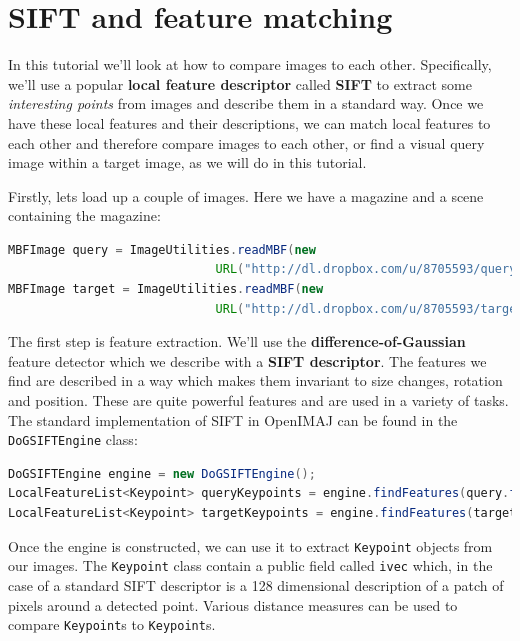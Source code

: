 \documentclass[10pt,a4paper,twoside,extrafontsizes]{memoir}
\begin{document}
\chapter{SIFT and feature matching}
In this tutorial we'll look at how to compare images to each other. Specifically, we'll use a
popular \textbf{local feature descriptor} called \textbf{SIFT} to extract some \emph{interesting points} 
from images and describe them in a standard way. Once we have these local features and their 
descriptions, we can match local features to each other and therefore compare images to each 
other, or find a visual query image within a target image, as we will do in this tutorial.

Firstly, lets load up a couple of images. Here we have a magazine and a scene containing the 
magazine:
\begin{lstlisting}[language=java]
MBFImage query = ImageUtilities.readMBF(new 
                             URL("http://dl.dropbox.com/u/8705593/query.jpg"));
MBFImage target = ImageUtilities.readMBF(new 
                             URL("http://dl.dropbox.com/u/8705593/target.jpg"));
\end{lstlisting}
The first step is feature extraction. We'll use the \textbf{difference-of-Gaussian} feature detector 
which we describe with a \textbf{SIFT descriptor}. The features we find are described in a way which 
makes them invariant to size changes, rotation and position. These are quite powerful features and 
are used in a variety of tasks. The standard implementation of SIFT in OpenIMAJ can be found in the 
\verb+DoGSIFTEngine+ class:
\begin{lstlisting}[language=java]
DoGSIFTEngine engine = new DoGSIFTEngine();	
LocalFeatureList<Keypoint> queryKeypoints = engine.findFeatures(query.flatten());
LocalFeatureList<Keypoint> targetKeypoints = engine.findFeatures(target.flatten());
\end{lstlisting}
Once the engine is constructed, we can use it to extract \verb+Keypoint+ objects from our images. 
The \verb+Keypoint+ class contain a public field called \verb+ivec+ which, in the case
of a standard SIFT descriptor is a 128 dimensional description of a patch of pixels around a 
detected point. Various distance measures can be used to compare \verb+Keypoint+s to \verb+Keypoint+s.
\end{document}

